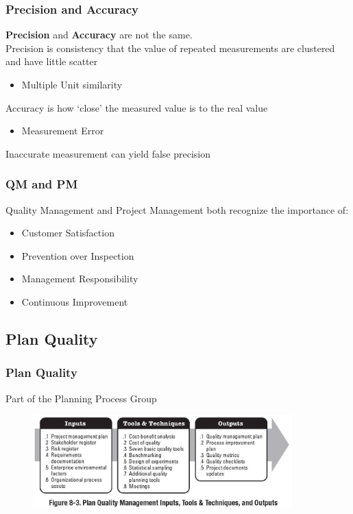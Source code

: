 \begin{frame}
\frametitle{Precision and Accuracy}
\textbf{Precision} and \textbf{Accuracy} are not the same.\\
Precision is consistency that the value of repeated measurements are clustered and have little scatter
\begin{itemize}
	\item Multiple Unit similarity
\end{itemize}
Accuracy is how `close' the measured value is to the real value
\begin{itemize}
	\item Measurement Error
\end{itemize}
Inaccurate measurement can yield false precision
\end{frame}




\begin{frame}
\frametitle{QM and PM}
Quality Management and Project Management both recognize the importance of:
\begin{itemize}
	\item Customer Satisfaction
	\item Prevention over Inspection
	\item Management Responsibility
	\item Continuous Improvement
\end{itemize}
\end{frame}


\subsection{Plan Quality}

\begin{frame}
\frametitle{Plan Quality}{Part of the Planning Process Group}
\begin{figure}
	\centering
		\includegraphics[width = 10cm]{images/fig8-3.jpg}
	\label{fig:8-3}
\end{figure}

\end{frame}




